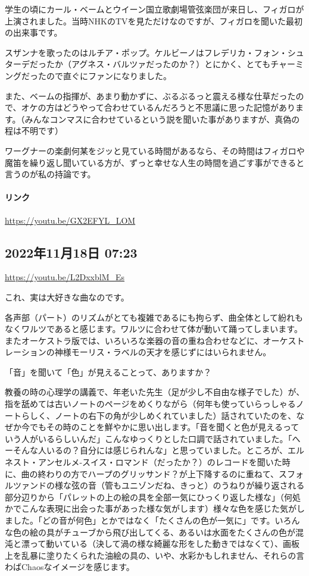 学生の頃にカール・ベームとウイーン国立歌劇場管弦楽団が来日し、フィガロが上演されました。当時NHKのTVを見ただけなのですが、フィガロを聞いた最初の出来事です。

スザンナを歌ったのはルチア・ポップ。ケルビーノはフレデリカ・フォン・シュターデだったか（アグネス・バルツァだったのか？）とにかく、とてもチャーミングだったので直ぐにファンになりました。

また、ベームの指揮が、あまり動かずに、ぶるぶるっと震える様な仕草だったので、オケの方はどうやって合わせているんだろうと不思議に思った記憶があります。（みんなコンマスに合わせているという説を聞いた事がありますが、真偽の程は不明です）

ワーグナーの楽劇何某をジッと見ている時間があるなら、その時間はフィガロや魔笛を繰り返し聞いている方が、ずっと幸せな人生の時間を過ごす事ができると言うのが私の持論です。

\paragraph{リンク}
\url{https://youtu.be/GX2EFYL_LOM}

\subsection*{2022年11月18日 07:23}

\url{https://youtu.be/L2DxxblM_Es}

これ、実は大好きな曲なのです。

各声部（パート）のリズムがとても複雑であるにも拘らず、曲全体として紛れもなくワルツであると感じます。ワルツに合わせて体が動いて踊ってしまいます。またオーケストラ版では、いろいろな楽器の音の重ね合わせなどに、オーケストレーションの神様モーリス・ラベルの天才を感じずにはいられません。

「音」を聞いて「色」が見えることって、ありますか？

教養の時の心理学の講義で、年老いた先生（足が少し不自由な様子でした）が、指を舐めては古いノートのページをめくりながら（何年も使っていらっしゃるノートらしく、ノートの右下の角が少しめくれていました）話されていたのを、なぜか今でもその時のことを鮮やかに思い出します。「音を聞くと色が見えるっていう人がいるらしいんだ」こんなゆっくりとした口調で話されていました。「へーそんな人いるの？自分には感じられんな」と思っていました。ところが、エルネスト・アンセルメ-スイス・ロマンド（だったか？）のレコードを聞いた時に、曲の終わりの方でハープのグリッサンド？が上下降するのに重ねて、スフォルツァンドの様な弦の音（管もユニゾンだね、きっと）のうねりが繰り返される部分辺りから「パレットの上の絵の具を全部一気にひっくり返した様な」（何処かでこんな表現に出会った事があった様な気がします）様々な色を感じた気がしました。「どの音が何色」とかではなく「たくさんの色が一気に」です。いろんな色の絵の具がチューブから飛び出してくる、あるいは水面をたくさんの色が混沌と漂って動いている（決して渦の様な綺麗な形をした動きではなくて）、画板上を乱暴に塗りたくられた油絵の具の、いや、水彩かもしれません、それらの言わばChaosなイメージを感じます。

